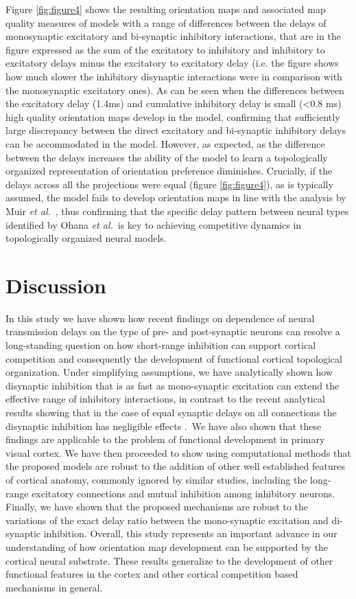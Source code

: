 \documentclass[utf8]{frontiersSCNS}
\newcommand{\etal}{\textit{et al.}}
\begin{document}
Figure \ref{fig:figure4} shows the resulting orientation maps and associated map quality measures of models with a range of differences between the delays of monosynaptic excitatory and bi-synaptic inhibitory interactions, that are in the figure expressed as the sum of the excitatory to inhibitory and inhibitory to excitatory delays minus the excitatory to excitatory delay (i.e. the figure shows how much slower the inhibitory disynaptic interactions were in comparison with the monosynaptic excitatory ones). 
As can be seen when the differences between the excitatory delay (1.4ms) and cumulative inhibitory delay is small (\textless 0.8 ms) high quality orientation maps develop in the model, confirming that sufficiently 
large discrepancy between the direct excitatory and bi-synaptic inhibitory delays can be accommodated in the model. However, as expected, as the difference between the delays increases the ability of the model to learn a topologically organized representation of orientation preference diminishes. Crucially, if the delays across all the projections were equal (figure \ref{fig:figure4}), as is typically assumed, the model fails to develop orientation maps in line with the analysis by Muir \etal \, \citep{Muir2014}, thus confirming that the specific delay pattern between neural types identified by Ohana \etal\,\citep{Ohana2012} is key to achieving competitive dynamics in topologically organized neural models.

\section{Discussion}

In this study we have shown how recent findings on dependence of neural transmission delays on the
type of pre- and post-synaptic neurons \citep{Ohana2012} can resolve a long-standing question on how short-range inhibition
can support cortical competition and consequently the development of functional cortical topological organization.
Under simplifying assumptions, we have analytically shown how disynaptic inhibition that is as fast as mono-synaptic 
excitation can extend the effective range of inhibitory interactions, in contrast to the recent analytical 
results showing that in the case of equal synaptic delays on all connections the disynaptic inhibition has negligible effects \citep{Muir2014}.\
We have also shown that these findings are applicable to the problem of functional development in primary visual cortex. We have then proceeded 
to show using computational methods that the proposed models are robust to the addition of other well established features of cortical anatomy, commonly 
ignored by similar studies, including the long-range excitatory connections and mutual inhibition among inhibitory neurons. Finally, we have shown 
that the proposed mechanisms are robust to the variations of the exact delay ratio between the mono-synaptic excitation and di-synaptic inhibition. 
Overall, this study represents an important advance in our understanding of how orientation map development can be supported by the cortical neural substrate. These
results generalize to the development of other functional features in the cortex and other cortical competition based mechanisms in general.
\end{document}
